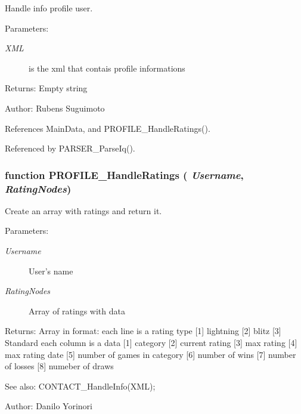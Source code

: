 Handle info profile user. 

\begin{Desc}
\item[Parameters:]
\begin{description}
\item[{\em XML}]is the xml that contais profile informations \end{description}
\end{Desc}
\begin{Desc}
\item[Returns:]Empty string \end{Desc}
\begin{Desc}
\item[Author:]Rubens Suguimoto \end{Desc}


References MainData, and PROFILE\_\-HandleRatings().

Referenced by PARSER\_\-ParseIq().
\subsubsection[PROFILE\_\-HandleRatings]{\setlength{\rightskip}{0pt plus 5cm}function PROFILE\_\-HandleRatings ( {\em Username}, \/   {\em RatingNodes})}\label{profile_2profile_8js_5f180d602f4a8a07a46e4f25016aa2b6}


Create an array with ratings and return it. 

\begin{Desc}
\item[Parameters:]
\begin{description}
\item[{\em Username}]User's name \item[{\em RatingNodes}]Array of ratings with data \end{description}
\end{Desc}
\begin{Desc}
\item[Returns:]Array in format: each line is a rating type [1] lightning [2] blitz [3] Standard each column is a data [1] category [2] current rating [3] max rating [4] max rating date [5] number of games in category [6] number of wins [7] number of losses [8] numeber of draws \end{Desc}
\begin{Desc}
\item[See also:]CONTACT\_\-HandleInfo(XML); \end{Desc}
\begin{Desc}
\item[Author:]Danilo Yorinori \end{Desc}



